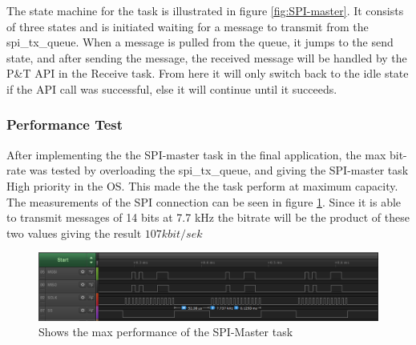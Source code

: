 The state machine for the task is illustrated in figure \ref{fig:SPI-master}. It consists of three states and is initiated waiting for a message to transmit from the spi\_tx\_queue. When a message is pulled from the queue, it jumps to the send state, and after sending the message, the received message will be handled by the P\&T API in the Receive task. From here it will only switch back to the idle state if the API call was successful, else it will continue until it succeeds. 


\subsubsection{Performance Test} 
\label{sec:PerformanceTest}
After implementing the the SPI-master task in the final application, the max bit-rate was tested by overloading the spi\_tx\_queue, and giving the SPI-master task High priority in the OS. This made the the task perform at maximum capacity. The measurements of the SPI connection can be seen in figure \ref{fig:HightPerformance}. Since it is able to transmit messages of 14 bits at 7.7 kHz the bitrate will be the product of these two values giving the result $107 kbit/sek$


\begin{figure}[h]
	\centering
	\includegraphics[scale = 0.6] {Billeder/HightPerformance}
	\caption{Shows the max performance of the SPI-Master task}
	\label{fig:HightPerformance}
\end{figure}
 